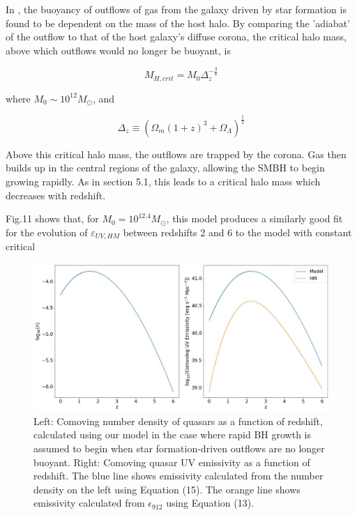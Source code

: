 \documentclass[12pt, twocolumn]{report}%
\begin{document}
In \cite{Quasar}, the buoyancy of outflows of gas from the galaxy driven by star formation is found to be dependent on the mass of the host halo. By comparing the 'adiabat' of the outflow to that of the host galaxy's diffuse corona, the critical halo mass, above which outflows would no longer be buoyant, is

\begin{equation}
    M_{H,crit}=M_0\Delta_z^{-\frac{3}{8}}
\end{equation}

\noindent where $M_0\sim10^{12}M_\odot$, and

\begin{equation}
    \Delta_z\equiv(\Omega_m(1+z)^3+\Omega_\Lambda)^{\frac{1}{3}}
\end{equation}

\noindent Above this critical halo mass, the outflows are trapped by the corona. Gas then builds up in the central regions of the galaxy, allowing the SMBH to begin growing rapidly. As in section 5.1, this leads to a critical halo mass which decreases with redshift.\par

Fig.11 shows that, for $M_0=10^{12.4}M_\odot$, this model produces a similarly good fit for the evolution of $\varepsilon_{UV,HM}$ between redshifts 2 and 6 to the model with constant critical

\onecolumngrid


\begin{figure}[H]
\centering
\includegraphics[width=\linewidth]{Plot_13_2.jpeg}
\caption{Left: Comoving number density of quasars as a function of redshift, calculated using our model in the case where rapid BH growth is assumed to begin when star formation-driven outflows are no longer buoyant. Right: Comoving quasar UV emissivity as a function of redshift. The blue line shows emissivity calculated from the number density on the left using Equation (15). The orange line shows emissivity calculated from $\epsilon_{912}$ using Equation (13).}
\label{fig:11}
\end{figure}
\end{document}
